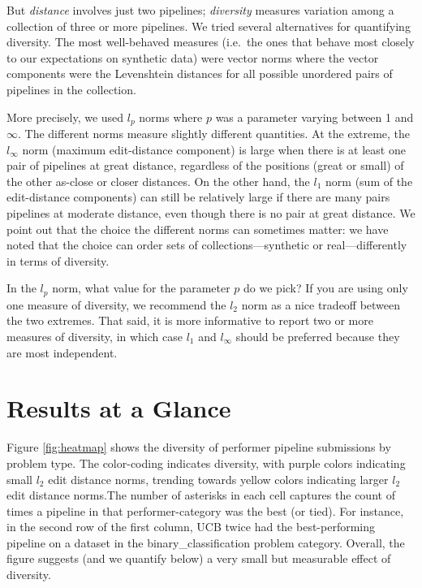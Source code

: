 \documentclass{article}
\begin{document}
But \emph{distance} involves just two pipelines; \emph{diversity}
measures variation among a collection of three or more pipelines.  We
tried several alternatives for quantifying diversity.  The most
well-behaved measures (i.e.\ the ones that behave most closely to our
expectations on synthetic data) were vector norms where the vector
components were the Levenshtein distances for all possible unordered
pairs of pipelines in the collection.

More precisely, we used $l_p$ norms where $p$ was a parameter varying
between 1 and $\infty$.  The different norms measure slightly different
quantities.  At the extreme, the $l_\infty$ norm (maximum
edit-distance component) is large when there is at least one pair of
pipelines at great distance, regardless of the positions (great or
small) of the other as-close or closer distances.  On the other hand,
the $l_1$ norm (sum of the edit-distance components) can still be
relatively large if there are many pairs pipelines at moderate
distance, even though there is no pair at great distance.  We point
out that the choice the different norms can sometimes matter: we have
noted that the choice can order sets of collections---synthetic or
real---differently in terms of diversity.


In the $l_p$ norm, what value for the parameter $p$ do we pick?  If
you are using only one measure of diversity, we recommend the $l_2$
norm as a nice tradeoff between the two extremes.  That said, it is
more informative to report two or more measures of diversity, in which
case $l_1$ and $l_\infty$ should be preferred because they are most
independent.

\section{Results at a Glance}
\label{sec:glance}
Figure \ref{fig:heatmap} shows the diversity of performer pipeline
submissions by problem type. The color-coding indicates diversity,
with purple colors indicating small $l_2$ edit distance norms,
trending towards yellow colors indicating larger $l_2$ edit distance
norms.The number of asterisks in each cell captures the count of times
a pipeline in that performer-category was the best (or tied). For
instance, in the second row of the first column, UCB twice had the
best-performing pipeline on a dataset in the binary\_classification
problem category. Overall, the figure suggests (and we quantify below)
a very small but measurable effect of diversity.
\end{document}
